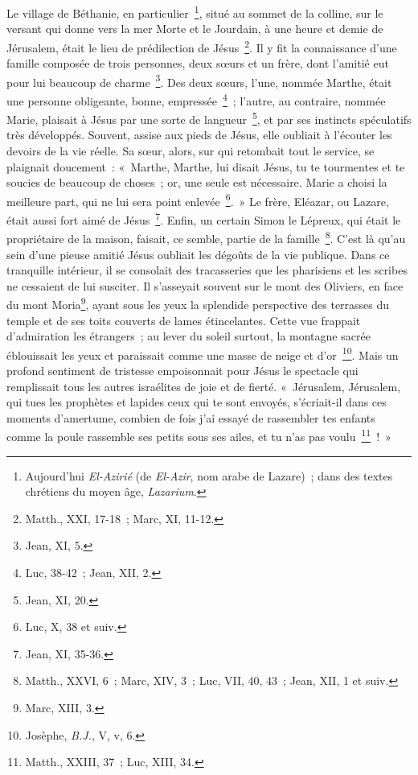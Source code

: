\documentclass[french,twoside]{book} %
\begin{document}
Le village de Béthanie, en particulier \footnote{ Aujourd’hui {\itshape El-Azirié} (de {\itshape El-Azir}, nom arabe de Lazare) ; dans des textes chrétiens du moyen âge, {\itshape Lazarium}.}, situé au sommet de la colline, sur le versant qui donne vers la mer Morte et le Jourdain, à une heure et demie de Jérusalem, était le lieu de prédilection de Jésus \footnote{Matth., XXI, 17-18 ; Marc, XI, 11-12.}. Il y fit la connaissance d’une famille composée de trois personnes, deux sœurs et un frère, dont l’amitié eut pour lui beaucoup de charme \footnote{Jean, XI, 5.}. Des deux sœurs, l’une, nommée Marthe, était une personne obligeante, bonne, empressée \footnote{Luc, 38-42 ; Jean, XII, 2.} ; l’autre, au contraire, nommée Marie, plaisait à Jésus par une sorte de langueur \footnote{Jean, XI, 20.}, et par ses instincts spéculatifs très développés. Souvent, assise aux pieds de Jésus, elle oubliait à l’écouter les devoirs de la vie réelle. Sa sœur, alors, sur qui retombait tout le service, se plaignait doucement : « Marthe, Marthe, lui disait Jésus, tu te tourmentes et te soucies de beaucoup de choses ; or, une seule est nécessaire. Marie a choisi la meilleure part, qui ne lui sera point enlevée \footnote{Luc, X, 38 et suiv.}. » Le frère, Eléazar, ou Lazare, était aussi fort aimé de Jésus \footnote{Jean, XI, 35-36.}. Enfin, un certain Simon le Lépreux, qui était le propriétaire de la maison, faisait, ce semble, partie de la famille \footnote{Matth., XXVI, 6 ; Marc, XIV, 3 ; Luc, VII, 40, 43 ; Jean, XII, 1 et suiv.}. C’est là qu’au sein d’une pieuse amitié Jésus oubliait les dégoûts de la vie publique. Dans ce tranquille intérieur, il se consolait des tracasseries que les pharisiens et les scribes ne cessaient de lui susciter. Il s’asseyait souvent sur le mont des Oliviers, en face du mont Moria\footnote{Marc, XIII, 3.}, ayant sous les yeux la splendide perspective des terrasses du temple et de ses toits couverts de lames étincelantes. Cette vue frappait d’admiration les étrangers ; au lever du soleil surtout, la montagne sacrée éblouissait les yeux et paraissait comme une masse de neige et d’or \footnote{ Josèphe, {\itshape B.J.}, V, v, 6.}. Mais un profond sentiment de tristesse empoisonnait pour Jésus le spectacle qui remplissait tous les autres israélites de joie et de fierté. « Jérusalem, Jérusalem, qui tues les prophètes et lapides ceux qui te sont envoyés, s’écriait-il dans ces moments d’amertume, combien de fois j’ai essayé de rassembler tes enfants comme la poule rassemble ses petits sous ses ailes, et tu n’as pas voulu \footnote{Matth., XXIII, 37 ; Luc, XIII, 34.} ! »\par
\end{document}
